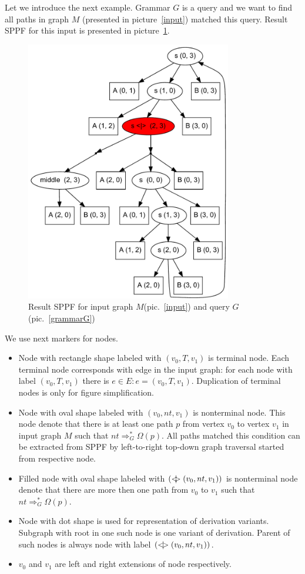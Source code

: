 \documentclass{sig-alternate} %
\begin{document}
Let we introduce the next example. Grammar $G$ is a query and we want to find all paths in graph $M$ (presented in picture~\ref{input}) matched this query.
Result SPPF for this input is presented in picture~\ref{SPPF}. 

\begin{figure}[h]
    \begin{center}
        \includegraphics[width=9cm]{dot/AnBn.pdf}
        \caption{Result SPPF for input graph $M$(pic.~\ref{input}) and query $G$(pic.~\ref{grammarG})}
        \label{SPPF}        
    \end{center}
\end{figure}

We use next markers for nodes.
\begin{itemize}
    \item Node with rectangle shape labeled with $(v_0, T, v_1)$ is terminal node. 
    Each terminal node corresponds with edge in the input graph: for each node with label $(v_0, T, v_1)$ there is $e\in E: e=(v_0,T,v_1)$.
    Duplication of terminal nodes is only for figure simplification.
    \item Node with oval shape labeled with $(v_0, nt, v_1)$ is nonterminal node. 
    This node denote that there is at least one path $p$ from vertex $v_0$ to vertex $v_1$ in input graph $M$ such that $nt \Rightarrow^*_G \Omega(p)$.
    All paths matched this condition can be extracted from SPPF by left-to-right top-down graph traversal started from respective node. 
    \item Filled node with oval shape labeled with $(<\mkern-11mu | \mkern-11mu> (v_0, nt, v_1))$ is nonterminal node denote that there are more then one path from $v_0$ to $v_1$ such that $nt \Rightarrow^*_G \Omega(p)$.
    \item Node with dot shape is used for representation of derivation variants.
    Subgraph with root in one such node is one variant of derivation.
    Parent of such nodes is always node with label $(<\mkern-9mu | \mkern-9mu> (v_0, nt, v_1))$.
    \item $v_0$ and $v_1$ are left and right extensions of node respectively.
\end{itemize}
\end{document}
